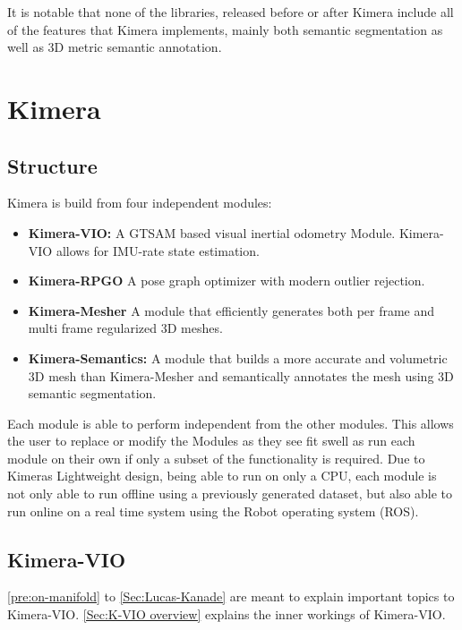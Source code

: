 \documentclass[11pt,a4paper]{article}
\begin{document}
It is notable that none of the libraries, released before or after Kimera include all of the features that Kimera implements,
mainly both semantic segmentation as well as 3D metric semantic annotation.



 
\section{Kimera} \label{Sec:kimera}
\subsection{Structure}
Kimera is build from four independent modules: 
\begin{itemize}
    \item \textbf{Kimera-VIO:} A GTSAM \cite{gtsam} based visual inertial odometry Module. Kimera-VIO allows for IMU-rate state estimation. 
    \item \textbf{Kimera-RPGO} A pose graph optimizer with modern outlier rejection.
    \item \textbf{Kimera-Mesher} A module that efficiently generates both per frame and multi frame regularized 3D meshes. 
    \item \textbf{Kimera-Semantics:} A module that builds a more accurate and volumetric 3D mesh than Kimera-Mesher and semantically annotates the mesh using 3D semantic segmentation. 
\end{itemize}
Each module is able to perform independent from the other modules. 
This allows the user to replace or modify the Modules as they see fit swell as run each module on their own if only a subset of the functionality is required.
Due to Kimeras Lightweight design, being able to run on only a CPU, each module is not only able to run  offline using a previously generated dataset, but also able to run online on a real time system using the Robot operating system (ROS).

\subsection{Kimera-VIO}
\ref{pre:on-manifold} to \ref{Sec:Lucas-Kanade} are meant to explain important topics to Kimera-VIO.
\ref{Sec:K-VIO overview} explains the inner workings of Kimera-VIO.
\end{document}
